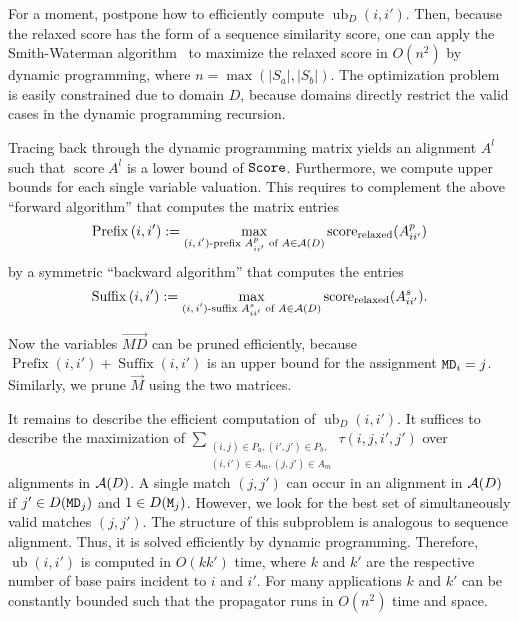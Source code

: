 \documentclass{easychair}
\newcommand{\score}{\operatorname{score}}
\begin{document}
For a moment, postpone how to efficiently compute
$\operatorname{ub}_D(i,i')$. Then, because the relaxed score has
the form of a sequence similarity score, one can apply the
Smith-Waterman algorithm~\cite{smith81:_compar_bioseq} to maximize the
relaxed score in $O(n^2)$ by dynamic programming, where
$n=\max(|S_a|,|S_b|)$. The optimization problem is easily constrained
due to domain $D$, because domains directly restrict the valid cases
in the dynamic programming recursion.

Tracing back through the dynamic programming matrix yields an alignment
$A^l$ such that $\score{A^l}$ is a lower bound of $\texttt{Score}$.
%
Furthermore, we compute upper bounds for each single variable
valuation. This requires to complement the above ``forward algorithm''
that computes the matrix entries
\vspace{-4pt}
\begin{displaymath}
  \operatorname{Prefix}{(i,i')} := \max_{\text{$(i,i')$-prefix
      $A^p_{ii'}$ of }A\in\cA(D)} \score_\text{relaxed}(A^p_{ii'})\\[-6pt]
\end{displaymath}
by a symmetric ``backward algorithm'' that computes the entries
\vspace{-4pt}
\begin{displaymath}
 \operatorname{Suffix}{(i,i')} :=
  \max_{\text{$(i,i')$-suffix $A^s_{ii'}$ of }A\in\cA(D)}
  \score_\text{relaxed}(A^s_{ii'}).
\end{displaymath}

Now the variables $\vec{MD}$ can be pruned efficiently, because
$\operatorname{Prefix}{(i,i')}+\operatorname{Suffix}{(i,i')}$ is an
upper bound for the assignment $\texttt{MD}_i=j$. Similarly, we prune
$\vec{M}$ using the two matrices.

It remains to describe the efficient computation of
$\operatorname{ub}_D(i,i')$. It suffices to describe the
maximization of $\sum_{\substack{(i,j)\in P_a,(i',j')\in
    P_b,\\(i,i')\in A_m,(j,j')\in A_m}} \tau(i,j,i',j')$
over alignments in ${\mathcal A}(D)$. A single match $(j,j')$ can occur in an
alignment in ${\mathcal A}(D)$ if $j'\in D(\texttt{MD}_j)$ and $1\in
D(\texttt{M}_j)$. However, we look for the best set of simultaneously
valid matches $(j,j')$. The structure of this subproblem is analogous
to sequence alignment. Thus, it is solved efficiently by dynamic
programming.
Therefore, $\operatorname{ub}(i,i')$ is computed in $O(kk')$
time, where $k$ and $k'$ are the respective number of base pairs
incident to $i$ and $i'$. For many applications $k$ and $k'$ can be
constantly bounded such that the propagator runs in $O(n^2)$ time and
space.
\end{document}
